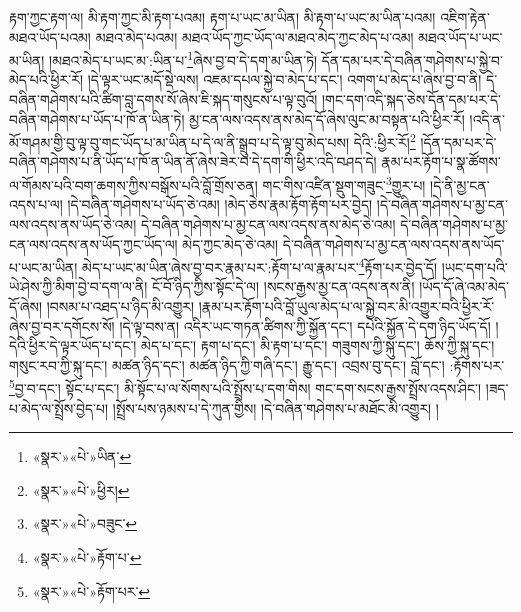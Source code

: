 རྟག་ཀྱང་རྟག་ལ། མི་རྟག་ཀྱང་མི་རྟག་པའམ། རྟག་པ་ཡང་མ་ཡིན། མི་རྟག་པ་ཡང་མ་ཡིན་པའམ། འཇིག་རྟེན་མཐའ་ཡོད་པའམ། མཐའ་མེད་པའམ། མཐའ་ཡོད་ཀྱང་ཡོད་ལ་མཐའ་མེད་ཀྱང་མེད་པ་འམ། མཐའ་ཡོད་པ་ཡང་མ་ཡིན། །མཐའ་མེད་པ་ཡང་མ་:ཡིན་པ་\footnote{«སྣར་»«པེ་»ཡིན་}ཞེས་བྱ་བ་དེ་དག་མ་ཡིན་ཏེ། དོན་དམ་པར་དེ་བཞིན་གཤེགས་པ་སྐྱེ་བ་མེད་པའི་ཕྱིར་རོ། །དེ་ལྟར་ཡང་མདོ་སྡེ་ལས། འཇམ་དཔལ་སྐྱེ་བ་མེད་པ་དང་། འགག་པ་མེད་པ་ཞེས་བྱ་བ་ནི། དེ་བཞིན་གཤེགས་པའི་ཚིག་བླ་དགས་སོ་ཞེས་ཇི་སྐད་གསུངས་པ་ལྟ་བུའོ། །གང་དག་འདི་སྐད་ཅེས་དོན་དམ་པར་དེ་བཞིན་གཤེགས་པ་ཡོད་པ་ཁོ་ན་ཡིན་ཏེ། མྱ་ངན་ལས་འདས་ནས་མེད་དོ་ཞེས་ལུང་མ་བསྟན་པའི་ཕྱིར་རོ། །འདི་ན་མོ་གཤམ་གྱི་བུ་ལྟ་བུ་གང་ཡོད་པ་མ་ཡིན་པ་དེ་ལ་ནི་སྒྲུབ་པ་དེ་ལྟ་བུ་མེད་པས། དེའི་:ཕྱིར་རོ།\footnote{«སྣར་»«པེ་»ཕྱིར།} །དོན་དམ་པར་དེ་བཞིན་གཤེགས་པ་ནི་ཡོད་པ་ཁོ་ན་ཡིན་ནོ་ཞེས་ཟེར་བ་དེ་དག་གི་ཕྱིར་འདི་བཤད་དེ། རྣམ་པར་རྟོག་པ་སྣ་ཚོགས་ལ་གོམས་པའི་བག་ཆགས་ཀྱིས་བསྒོས་པའི་བློ་གྲོས་ཅན། གང་གིས་འཛིན་སྡུག་གཟུང་\footnote{«སྣར་»«པེ་»བཟུང་}གྱུར་པ། །དེ་ནི་མྱ་ངན་འདས་པ་ལ། །དེ་བཞིན་གཤེགས་པ་ཡོད་ཅེ་འམ། །མེད་ཅེས་རྣམ་རྟོག་རྟོག་པར་བྱེད། །དེ་བཞིན་གཤེགས་པ་མྱ་ངན་ལས་འདས་ནས་ཡོད་ཅེ་འམ། དེ་བཞིན་གཤེགས་པ་མྱ་ངན་ལས་འདས་ནས་མེད་ཅེ་འམ། དེ་བཞིན་གཤེགས་པ་མྱ་ངན་ལས་འདས་ནས་ཡོད་ཀྱང་ཡོད་ལ། མེད་ཀྱང་མེད་ཅེ་འམ། དེ་བཞིན་གཤེགས་པ་མྱ་ངན་ལས་འདས་ནས་ཡོད་པ་ཡང་མ་ཡིན། མེད་པ་ཡང་མ་ཡིན་ཞེས་བྱ་བར་རྣམ་པར་:རྟོག་པ་ལ་རྣམ་པར་\footnote{«སྣར་»«པེ་»རྟོག་པ་}རྟོག་པར་བྱེད་དོ། །ཡང་དག་པའི་ཡེ་ཤེས་ཀྱི་མིག་བྱེ་བ་དག་ལ་ནི། ངོ་བོ་ཉིད་ཀྱིས་སྟོང་དེ་ལ། །སངས་རྒྱས་མྱ་ངན་འདས་ནས་ནི། །ཡོད་དོ་ཞེ་འམ་མེད་དོ་ཞེས། །བསམ་པ་འཐད་པ་ཉིད་མི་འགྱུར། །རྣམ་པར་རྟོག་པའི་བློ་ཡུལ་མེད་པ་ལ་སྐྱེ་བར་མི་འགྱུར་བའི་ཕྱིར་རོ་ཞེས་བྱ་བར་དགོངས་སོ། །དེ་ལྟ་བས་ན། འདིར་ཡང་གཏན་ཚིགས་ཀྱི་སྐྱོན་དང་། དཔེའི་སྐྱོན་དེ་དག་ཉིད་ཡོད་དོ། །དེའི་ཕྱིར་དེ་ལྟར་ཡོད་པ་དང་། མེད་པ་དང་། རྟག་པ་དང་། མི་རྟག་པ་དང་། གཟུགས་ཀྱི་སྐུ་དང་། ཆོས་ཀྱི་སྐུ་དང་། གསུང་རབ་ཀྱི་སྐུ་དང་། མཚན་ཉིད་དང་། མཚན་ཉིད་ཀྱི་གཞི་དང་། རྒྱུ་དང་། འབྲས་བུ་དང་། བློ་དང་། :རྟོགས་པར་\footnote{«སྣར་»«པེ་»རྟོག་པར་}བྱ་བ་དང་། སྟོང་པ་དང་། མི་སྟོང་པ་ལ་སོགས་པའི་སྤྲོས་པ་དག་གིས། གང་དག་སངས་རྒྱས་སྤྲོས་འདས་ཤིང་། །ཟད་པ་མེད་ལ་སྤྲོས་བྱེད་པ། །སྤྲོས་པས་ཉམས་པ་དེ་ཀུན་གྱིས། །དེ་བཞིན་གཤེགས་པ་མཐོང་མི་འགྱུར། །
